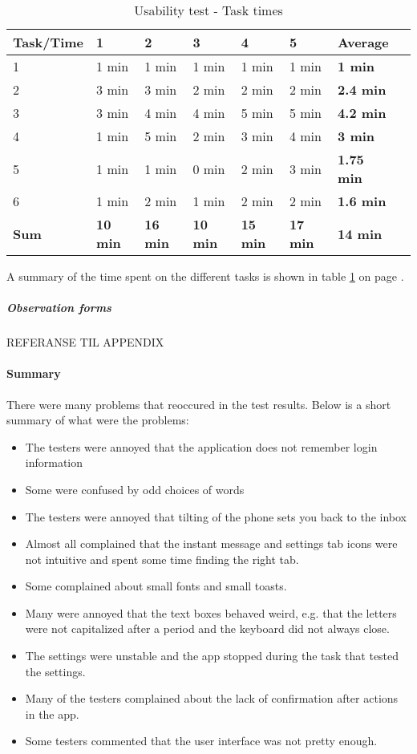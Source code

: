 				\begin{table}
			\begin{tabular}{l|l|l|l|l|l|l|l}	\hline
				\textbf{Task/Time}&\textbf{1}&\textbf{2}&\textbf{3}&\textbf{4}&\textbf{5}&\textbf{Average}\\ \hline \hline
				1&1 min&1 min&1 min&1 min&1 min&\textbf{1 min}\\ \hline
				2&3 min&3 min&2 min&2 min&2 min&\textbf{2.4 min}\\ \hline
				3&3 min&4 min&4 min&5 min&5 min&\textbf{4.2 min}\\ \hline
				4&1 min&5 min&2 min&3 min&4 min&\textbf{3 min}\\ \hline
				5&1 min&1 min&0 min&2 min&3 min&\textbf{1.75 min}\\ \hline
				6&1 min&2 min&1 min&2 min&2 min&\textbf{1.6 min}\\ \hline
				\textbf{Sum}&\textbf{10 min}&\textbf{16 min}&\textbf{10 min}&\textbf{15 min}&\textbf{17 min}&\textbf{14 min}\\ \hline 
				
			\end{tabular}
			\caption{Usability test - Task times} \label{tab:usabilitytasktime}
		\end{table}
			A summary of the time spent on the different tasks is shown in table \ref{tab:usabilitytasktime} on page \pageref{tab:usabilitytasktime}.
			\subparagraph{Observation forms}
			REFERANSE TIL APPENDIX
		\paragraph{Summary}
			There were many problems that reoccured in the test results. Below is a short summary of what were the problems:
			\begin{itemize}
				\item{}The testers were annoyed that the application does not remember login information
				\item{}Some were confused by odd choices of words
				\item{}The testers were annoyed that tilting of the phone sets you back to the inbox
				\item{}Almost all complained that the instant message and settings tab icons were not intuitive and spent some time finding the right tab.
				\item{}Some complained about small fonts and small toasts.
				\item{}Many were annoyed that the text boxes behaved weird, e.g. that the letters were not capitalized after a period and the keyboard did not always close. 
				\item{}The settings were unstable and the app stopped during the task that tested the settings.
				\item{}Many of the testers complained about the lack of confirmation after actions in the app.
				\item{}Some testers commented that the user interface was not pretty enough.
			\end{itemize}
